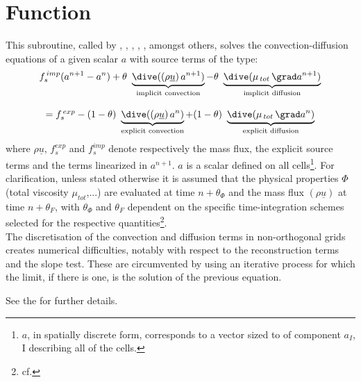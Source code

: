 \section*{Function}
This subroutine, called by , , ,
, , amongst others, solves the convection-diffusion equations
of a given scalar $a$ with source terms of the type:
\begin{equation}\label{Base_Codits_eq_ref}
\begin{array}{c}
\displaystyle f_s^{\,imp} (a^{n+1} - a^{n}) +
\theta \ \underbrace{\dive((\rho \underline{u})\,a^{n+1})}_{\text{implicit convection}}
-\theta \ \underbrace{\dive(\mu_{\,tot}\,\grad a^{n+1})}_{\text{implicit diffusion}}
\\\\
= f_s^{\,exp}-(1-\theta) \ \underbrace{\dive((\rho \underline{u})\,a^{n})}_{\text{explicit convection}}
 + (1-\theta) \ \underbrace{\dive(\mu_{\,tot}\,\grad a^{n})}_{\text{explicit diffusion}}
\end{array}
\end{equation}
where $\rho \underline{u}$, $f_s^{exp}$ and $f_s^{imp}$ denote respectively the mass flux, the explicit source terms and the terms linearized in $a^{n+1}$.
$a$ is a scalar defined on all cells\footnote{$a$, in spatially discrete form, corresponds to a vector sized to  of component $a_I$, I describing all of the cells.}.
For clarification, unless stated otherwise it is assumed that the physical properties $\Phi$ (total
viscosity $\mu_{tot}$,...) are evaluated at time $n+\theta_\Phi$ and the mass flux $(\rho\underline{u})$
at time $n+\theta_F$, with $\theta_\Phi$ and $\theta_F$ dependent on the specific time-integration schemes
selected for the respective quantities\footnote{cf. }.
\\
The discretisation of the convection and diffusion terms in non-orthogonal grids creates numerical difficulties, notably with respect to the reconstruction terms and the slope test. These are circumvented by using an iterative process for which the limit, if there is one, is the solution of the previous equation.

See the 
for further details.

